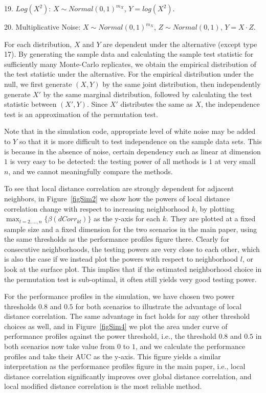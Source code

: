 \documentclass[12pt]{article}
\begin{document}
19. $Log(X^2)$: $X \sim Normal(0, 1)^{m_{X}}$, $Y=log(X^2)$.

20. Multiplicative Noise: $X \sim Normal(0, 1)^{m_{X}}$, $Z \sim Normal(0, 1)$, $Y=X \cdot Z$.

For each distribution, $X$ and $Y$ are dependent under the alternative (except type 17). By generating the sample data and calculating the sample test statistic for sufficiently many Monte-Carlo replicates, we obtain the empirical distribution of the test statistic under the alternative. For the empirical distribution under the null, we first generate $(X,Y)$ by the same joint distribution, then independently generate $X'$ by the same marginal distribution, followed by calculating the test statistic between $(X',Y)$. Since $X'$ distributes the same as $X$, the independence test is an approximation of the permutation test.

Note that in the simulation code, appropriate level of white noise may be added to $Y$ so that it is more difficult to test independence on the sample data sets. This is because in the absence of noise, certain dependency such as linear at dimension $1$ is very easy to be detected: the testing power of all methods is $1$ at very small $n$, and we cannot meaningfully compare the methods.

To see that local distance correlation are strongly dependent for adjacent neighbors, in Figure~\ref{figSim2} we show how the powers of local distance correlation change with respect to increasing neighborhood $k$, by plotting $\max_{l=2,\ldots,n} \{\beta(dCorr_{kl})\}$ as the y-axis for each $k$. They are plotted at a fixed sample size and a fixed dimension for the two scenarios in the main paper, using the same thresholds as the performance profiles figure there. Clearly for consecutive neighborhoods, the testing powers are very close to each other, which is also the case if we instead plot the powers with respect to neighborhood $l$, or look at the surface plot. This implies that if the estimated neighborhood choice in the permutation test is sub-optimal, it often still yields very good testing power.

For the performance profiles in the simulation, we have chosen two power thresholds $0.8$ and $0.5$ for both scenarios to illustrate the advantage of local distance correlation. The same advantage in fact holds for any other threshold choices as well, and in Figure~\ref{figSim4} we plot the area under curve of performance profiles against the power threshold, i.e., the threshold $0.8$ and $0.5$ in both scenarios now take value from $0$ to $1$, and we calculate the performance profiles and take their AUC as the y-axis. This figure yields a similar interpretation as the performance profiles figure in the main paper, i.e., local distance correlation significantly improves over global distance correlation, and local modified distance correlation is the most reliable method.
\end{document}
